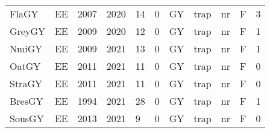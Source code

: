 \begin{table}[htbp]
\begin{tabular}{p{1cm}p{1cm}p{1cm}p{1cm}p{0.8cm}p{0.8cm}p{1cm}p{2cm}p{2cm}p{1cm}p{1cm}}
  FlaGY & EE & 2007 & 2020 & 14 & 0 & GY & trap & nr & F & 3 \\ 
  GreyGY & EE & 2009 & 2020 & 12 & 0 & GY & trap & nr & F & 1 \\ 
  NmiGY & EE & 2009 & 2021 & 13 & 0 & GY & trap & nr & F & 1 \\ 
  OatGY & EE & 2011 & 2021 & 11 & 0 & GY & trap & nr & F & 0 \\ 
  StraGY & EE & 2011 & 2021 & 11 & 0 & GY & trap & nr & F & 0 \\ 
  BresGY & EE & 1994 & 2021 & 28 & 0 & GY & trap & nr & F & 1 \\ 
  SousGY & EE & 2013 & 2021 & 9 & 0 & GY & trap & nr & F & 0 \\ 
   \hline
\end{tabular}
\end{table}
